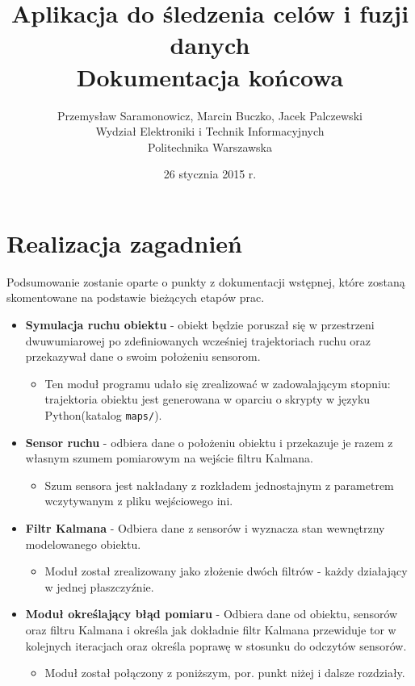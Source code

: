 \documentclass{article}
\title{Aplikacja do śledzenia celów i fuzji danych  \\ {\large Dokumentacja końcowa}}
\author{Przemysław Saramonowicz, Marcin Buczko, Jacek Palczewski \\ Wydział Elektroniki i Technik Informacyjnych \\ Politechnika Warszawska}
\date{26 stycznia 2015 r.}
\begin{document}
	\maketitle
	
	\section{Realizacja zagadnień}
		Podsumowanie zostanie oparte o punkty z dokumentacji wstępnej, które zostaną skomentowane na podstawie bieżących etapów prac.	
		\begin{itemize}
		\item \textbf{Symulacja ruchu obiektu} - obiekt będzie poruszał się w przestrzeni dwuwumiarowej po zdefiniowanych wcześniej trajektoriach ruchu oraz przekazywał dane o swoim położeniu sensorom.
		\begin{itemize}
			\item Ten moduł programu udało się zrealizować w zadowalającym stopniu: trajektoria obiektu jest generowana w oparciu o skrypty w języku Python(katalog \texttt{maps/}).
		\end{itemize}

		\item \textbf{Sensor ruchu} - odbiera dane o położeniu obiektu i przekazuje je razem z własnym szumem pomiarowym na wejście filtru Kalmana.
			\begin{itemize}
				\item Szum sensora jest nakładany z rozkładem jednostajnym z parametrem wczytywanym z pliku wejściowego ini. 
			\end{itemize}

		\item \textbf{Filtr Kalmana} - Odbiera dane z sensorów i wyznacza stan wewnętrzny modelowanego obiektu. 
			\begin{itemize}
				\item Moduł został zrealizowany jako złożenie dwóch filtrów - każdy działający w jednej płaszczyźnie. 
			\end{itemize}
		
		\item \textbf{Moduł określający błąd pomiaru} - Odbiera dane od obiektu, sensorów oraz filtru Kalmana i określa jak dokładnie filtr Kalmana przewiduje tor w kolejnych iteracjach oraz określa poprawę w stosunku do odczytów sensorów.
			\begin{itemize}
				\item Moduł został połączony z poniższym, por. punkt niżej i dalsze rozdziały.
			\end{itemize}
				

\end{itemize}
\end{document}
